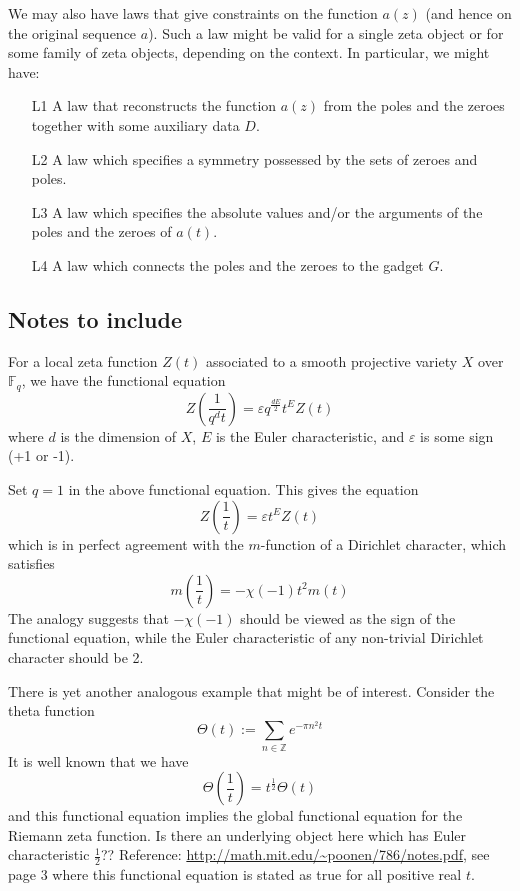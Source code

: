 \documentclass[paper=a4, fontsize=11pt]{scrartcl} %
\numberwithin{equation}{section} %
\numberwithin{figure}{section} %
\numberwithin{table}{section} %
\begin{document}
We may also have laws that give constraints on the function $a(z)$ (and hence on the original sequence $a$). Such a law might be valid for a single zeta object or for some family of zeta objects, depending on the context. In particular, we might have:

\begin{itemize}
\item[L1] A law that reconstructs the function $a(z)$ from the poles and the zeroes together with some auxiliary data $D$.
\item[L2] A law which specifies a symmetry possessed by the sets of zeroes and poles.
\item[L3] A law which specifies the absolute values and/or the arguments of the poles and the zeroes of $a(t)$.
\item[L4] A law which connects the poles and the zeroes to the gadget $G$.
\end{itemize}



\subsection{Notes to include}

For a local zeta function $Z(t)$ associated to a smooth projective variety $X$ over $\mathbb{F}_q$, we have the functional equation
$$  Z \left( \frac{1}{q^d t} \right) = \varepsilon q^{\frac{dE}{2}} t^E Z(t) $$
where $d$ is the dimension of $X$, $E$ is the Euler characteristic, and $\varepsilon$ is some sign (+1 or -1).

Set $q=1$ in the above functional equation. This gives the equation
$$  Z \left( \frac{1}{t} \right) = \varepsilon t^E Z(t) $$
which is in perfect agreement with the $m$-function of a Dirichlet character, which satisfies
$$  m \left( \frac{1}{t} \right) = -\chi(-1) t^2 m(t) $$
The analogy suggests that $-\chi(-1)$ should be viewed as the sign of the functional equation, while the Euler characteristic of any non-trivial Dirichlet character should be 2.

There is yet another analogous example that might be of interest. Consider the theta function
$$ \Theta(t) := \sum_{n \in \mathbb{Z}} e^{-\pi n^2 t}   $$
It is well known that we have
$$ \Theta(\frac{1}{t}) =  t^{\frac{1}{2}} \Theta(t)   $$
and this functional equation implies the global functional equation for the Riemann zeta function. Is there an underlying object here which has Euler characteristic $\frac{1}{2}$??
Reference: \url{http://math.mit.edu/~poonen/786/notes.pdf}, see page 3 where this functional equation is stated as true for all positive real $t$.





\end{document}
